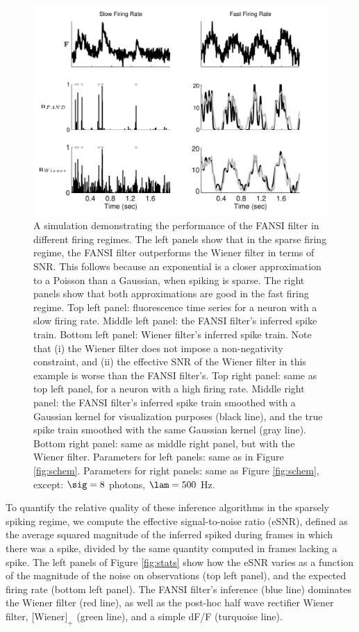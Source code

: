 \begin{figure}[H]
\centering \includegraphics[width=.9\linewidth]{../figs/example_sim}
\caption{A simulation demonstrating the performance of the FANSI filter in different firing regimes. The left panels show that in the sparse firing regime, the FANSI filter outperforms the Wiener filter in terms of SNR.  This follows because an exponential is a closer approximation to a Poisson than a Gaussian, when spiking is sparse. The right panels show that both approximations are good in the fast firing regime. Top left panel: fluorescence time series for a neuron with a slow firing rate.  Middle left panel: the FANSI filter's inferred spike train.  Bottom left panel: Wiener filter's inferred spike train.  Note that (i) the Wiener filter does not impose a non-negativity constraint, and (ii) the effective SNR of the Wiener filter in this example is worse than the FANSI filter's.  Top right panel: same as top left panel, for a neuron with a high firing rate.  Middle right panel: the FANSI filter's inferred spike train smoothed with a Gaussian kernel for visualization purposes (black line), and the true spike train smoothed with the same Gaussian kernel (gray line).  Bottom right panel: same as middle right panel, but with the Wiener filter. Parameters for left panels: same as in Figure \ref{fig:schem}.  Parameters for right panels: same as Figure \ref{fig:schem}, except: $\sig=8$ photons, $\lam=500$ Hz.} \label{fig:wiener}
\end{figure}

To quantify the relative quality of these inference algorithms in the sparsely spiking regime, we compute the effective signal-to-noise ratio (eSNR), defined as the average squared magnitude of the inferred spiked during frames in which there was a spike, divided by the same quantity computed in frames lacking a spike.  The left panels of Figure \ref{fig:stats} show how the eSNR varies as a function of the magnitude of the noise on observations (top left panel), and the expected firing rate (bottom left panel).  The FANSI filter's inference (blue line) dominates the Wiener filter (red line), as well as the post-hoc half wave rectifier Wiener filter, $[$Wiener$]_+$ (green line), and a simple dF/F (turquoise line).  

